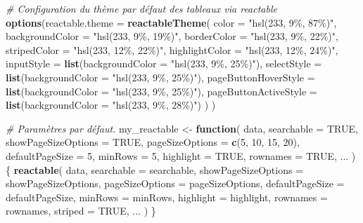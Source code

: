 \documentclass[
  french,
]{book}
\newenvironment{Shaded}{\begin{snugshade}}{\end{snugshade}}
\newcommand{\CommentTok}[1]{\textcolor[rgb]{0.56,0.35,0.01}{\textit{#1}}}
\newcommand{\ControlFlowTok}[1]{\textcolor[rgb]{0.13,0.29,0.53}{\textbf{#1}}}
\newcommand{\DataTypeTok}[1]{\textcolor[rgb]{0.13,0.29,0.53}{#1}}
\newcommand{\DecValTok}[1]{\textcolor[rgb]{0.00,0.00,0.81}{#1}}
\newcommand{\KeywordTok}[1]{\textcolor[rgb]{0.13,0.29,0.53}{\textbf{#1}}}
\newcommand{\NormalTok}[1]{#1}
\newcommand{\OtherTok}[1]{\textcolor[rgb]{0.56,0.35,0.01}{#1}}
\newcommand{\StringTok}[1]{\textcolor[rgb]{0.31,0.60,0.02}{#1}}
\begin{document}
\begin{Shaded}
\begin{Highlighting}[]
\CommentTok{\# Configuration du thème par défaut des tableaux via \textquotesingle{}reactable\textquotesingle{}}
\KeywordTok{options}\NormalTok{(}\DataTypeTok{reactable.theme =} \KeywordTok{reactableTheme}\NormalTok{(}
  \DataTypeTok{color =} \StringTok{"hsl(233, 9\%, 87\%)"}\NormalTok{,}
  \DataTypeTok{backgroundColor =} \StringTok{"hsl(233, 9\%, 19\%)"}\NormalTok{, }
  \DataTypeTok{borderColor =} \StringTok{"hsl(233, 9\%, 22\%)"}\NormalTok{, }
  \DataTypeTok{stripedColor =} \StringTok{"hsl(233, 12\%, 22\%)"}\NormalTok{, }
  \DataTypeTok{highlightColor =} \StringTok{"hsl(233, 12\%, 24\%)"}\NormalTok{,}
  \DataTypeTok{inputStyle =} \KeywordTok{list}\NormalTok{(}\DataTypeTok{backgroundColor =} \StringTok{"hsl(233, 9\%, 25\%)"}\NormalTok{), }
  \DataTypeTok{selectStyle =} \KeywordTok{list}\NormalTok{(}\DataTypeTok{backgroundColor =} \StringTok{"hsl(233, 9\%, 25\%)"}\NormalTok{), }
  \DataTypeTok{pageButtonHoverStyle =} \KeywordTok{list}\NormalTok{(}\DataTypeTok{backgroundColor =} \StringTok{"hsl(233, 9\%, 25\%)"}\NormalTok{), }
  \DataTypeTok{pageButtonActiveStyle =} \KeywordTok{list}\NormalTok{(}\DataTypeTok{backgroundColor =} \StringTok{"hsl(233, 9\%, 28\%)"}\NormalTok{)}
\NormalTok{  )}
\NormalTok{)}

\CommentTok{\# Paramètres par défaut.}
\NormalTok{my\_reactable \textless{}{-}}\StringTok{ }\ControlFlowTok{function}\NormalTok{(}
\NormalTok{  data,}
  \DataTypeTok{searchable =} \OtherTok{TRUE}\NormalTok{,}
  \DataTypeTok{showPageSizeOptions =} \OtherTok{TRUE}\NormalTok{,}
  \DataTypeTok{pageSizeOptions =} \KeywordTok{c}\NormalTok{(}\DecValTok{5}\NormalTok{, }\DecValTok{10}\NormalTok{, }\DecValTok{15}\NormalTok{, }\DecValTok{20}\NormalTok{),}
  \DataTypeTok{defaultPageSize =} \DecValTok{5}\NormalTok{, }
  \DataTypeTok{minRows =} \DecValTok{5}\NormalTok{,}
  \DataTypeTok{highlight =} \OtherTok{TRUE}\NormalTok{,}
  \DataTypeTok{rownames =} \OtherTok{TRUE}\NormalTok{,}
\NormalTok{  ...}
\NormalTok{) \{}
  \KeywordTok{reactable}\NormalTok{(}
\NormalTok{    data,}
    \DataTypeTok{searchable =}\NormalTok{ searchable,}
    \DataTypeTok{showPageSizeOptions =}\NormalTok{ showPageSizeOptions,}
    \DataTypeTok{pageSizeOptions =}\NormalTok{ pageSizeOptions,}
    \DataTypeTok{defaultPageSize =}\NormalTok{ defaultPageSize, }
    \DataTypeTok{minRows =}\NormalTok{ minRows,}
    \DataTypeTok{highlight =}\NormalTok{ highlight,}
    \DataTypeTok{rownames =}\NormalTok{ rownames,}
    \DataTypeTok{striped =} \OtherTok{TRUE}\NormalTok{,}
\NormalTok{    ...}
\NormalTok{  )}
\NormalTok{\}}
\end{Highlighting}
\end{Shaded}
\end{document}
